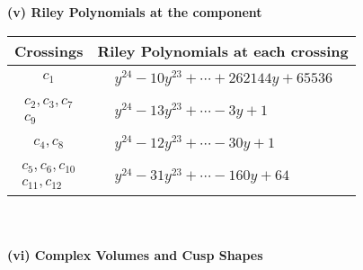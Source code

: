 \documentclass[1p]{elsarticle_modified}
\theoremstyle{definition}
\begin{document}
\newpage\renewcommand{\arraystretch}{1}
\flushleft \textbf{(v) Riley Polynomials at the component}\newline \\
\begin{tabular}{m{50pt}|m{274pt}}
Crossings & \hspace{64pt}Riley Polynomials at each crossing \\
\hline $$\begin{aligned}c_{1}\end{aligned}$$&$\begin{aligned}
&y^{24}-10 y^{23}+\cdots+262144 y+65536
\end{aligned}$\\
\hline $$\begin{aligned}c_{2},c_{3},c_{7}\\c_{9}\end{aligned}$$&$\begin{aligned}
&y^{24}-13 y^{23}+\cdots-3 y+1
\end{aligned}$\\
\hline $$\begin{aligned}c_{4},c_{8}\end{aligned}$$&$\begin{aligned}
&y^{24}-12 y^{23}+\cdots-30 y+1
\end{aligned}$\\
\hline $$\begin{aligned}c_{5},c_{6},c_{10}\\c_{11},c_{12}\end{aligned}$$&$\begin{aligned}
&y^{24}-31 y^{23}+\cdots-160 y+64
\end{aligned}$\\
\hline
\end{tabular}\\~\\
\newpage\flushleft \textbf{(vi) Complex Volumes and Cusp Shapes}
\end{document}
